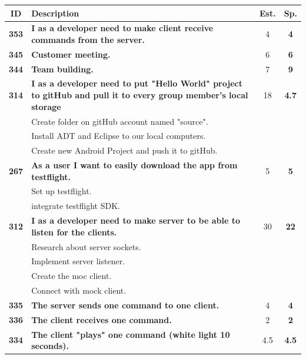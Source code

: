 \begin{longtable}{cp{8cm}cc} 
\toprule[1mm]
\textbf{ID} 	& \textbf{Description} 									& \textbf{Est.} & \textbf{Sp.} \\
\hline
\textbf{353} 	& {\bf I as a developer need to make client receive commands from the server.} 	& 	4		& \textbf{4} \\

\textbf{345} 	& {\bf Customer meeting.} 	& 		6	& \textbf{6} \\

\textbf{344} 	& {\bf Team building.} 	& 		7	& \textbf{9} \\
				
\textbf{314} 	& {\bf I as a developer need to put "Hello World" project to gitHub and pull it to every group member's local storage} 	& 	18	& \textbf{ 4.7} \\
				& Create folder on gitHub account named "source".	&  &  \\
				& Install ADT and Eclipse to our local computers. 	&  &  \\
				& Create new Android Project and push it to gitHub. 	&  &  \\
				
\textbf{267} 	& {\bf As a user I want to easily download the app from testflight. } 	& 		5	& \textbf{5} \\
				& Set up testflight.	&  &  \\
				& integrate testflight SDK. &  &  \\
				
\textbf{312} 	& {\bf I as a developer need to make server to be able to listen for the clients.} 	& 	30	& \textbf{22} \\
				& Research about server sockets.	&  &  \\
				& Implement server listener.	&  &  \\
				& Create the moc client. &  &  \\
				& Connect with mock client. &  &  \\
				
\textbf{335} 	& {\bf The server sends one command to one client. } 	& 		4	& \textbf{4} \\

\textbf{336} 	& {\bf The client receives one command. } 	& 	2	& \textbf{2} \\

\textbf{334} 	& {\bf The client "plays" one command (white light 10 seconds). } 	& 		4.5	& \textbf{4.5} \\


\end{longtable}
